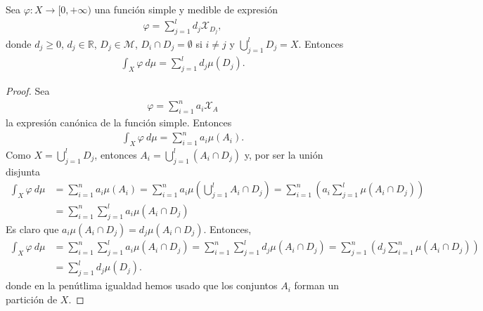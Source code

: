\begin{prop}
Sea $\varphi: X \longrightarrow [0,+\infty)$ una función simple y medible de expresión
\begin{align*}
    \varphi = \sum_{j=1}^{l}{d_j \mathcal{X}_{D_j}},
\end{align*}
donde $d_j \ge 0$, $d_j \in \mathbb{R}$, $D_j \in \mathcal{M}$, $D_i \cap D_j = \emptyset$ si $i \not = j$ y $\bigcup_{j=1}^{l}{D_j} = X$. Entonces
\begin{align*}
    \int_{X}{\varphi \ d\mu} = \sum_{j=1}^{l}{d_j \mu(D_j)}.
\end{align*}
\end{prop}

\begin{proof}
Sea
\begin{align*}
    \varphi = \sum_{i=1}^{n}{a_i \mathcal{X}_A}
\end{align*}
la expresión canónica de la función simple. Entonces
\begin{align*}
    \int_{X}{\varphi \ d\mu} = \sum_{i=1}^{n}{a_i\mu(A_i)}.
\end{align*}
Como $X = \bigcup_{j=1}^{l}{D_j}$, entonces $A_i = \bigcup_{j=1}^{l}{(A_i \cap D_j)}$ y, por ser la unión disjunta
\begin{align*}
    \int_{X}{\varphi \ d\mu} &= \sum_{i=1}^{n}{a_i\mu(A_i)} = \sum_{i=1}^{n}{a_i\mu \left(\bigcup_{j=1}^{l}{A_i \cap D_j}\right)} = \sum_{i=1}^{n}{ \left( a_i \sum_{j=1}^{l}{\mu(A_i \cap D_j)}\right)}\\ 
    &= \sum_{i=1}^{n}{\sum_{j=1}^{l}{a_i\mu(A_i \cap D_j)}}
\end{align*}
Es claro que $a_i \mu(A_i \cap D_j) = d_j \mu(A_i \cap D_j)$. Entonces,
\begin{align*}
    \int_{X}{\varphi \ d\mu} &= \sum_{i=1}^{n}{\sum_{j=1}^{l}{a_i\mu(A_i \cap D_j)}} = \sum_{i=1}^{n}{\sum_{j=1}^{l}{d_j\mu(A_i \cap D_j)}} = \sum_{j=1}^{n}{ \left( d_j\sum_{i=1}^{n}{\mu(A_i \cap D_j)} \right)}\\
    &= \sum_{j=1}^{l}{d_j \mu(D_j)}.
\end{align*}
donde en la penútlima igualdad hemos usado que los conjuntos $A_i$ forman un partición de $X$.
\end{proof}

